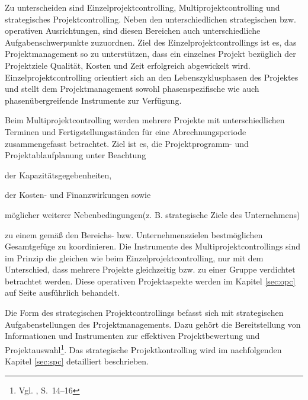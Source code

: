 Zu unterscheiden sind Einzelprojektcontrolling, Multiprojektcontrolling und strategisches Projektcontrolling. Neben den unterschiedlichen strategischen bzw. operativen Ausrichtungen, sind diesen Bereichen auch unterschiedliche Aufgabenschwerpunkte zuzuordnen.
Ziel des Einzelprojektcontrollings ist es, das Projektmanagement so zu unterstützen, dass ein einzelnes Projekt bezüglich der Projektziele Qualität, Kosten und Zeit erfolgreich abgewickelt wird. Einzelprojektcontrolling orientiert sich an den Lebenszyklusphasen des Projektes und stellt dem Projektmanagement sowohl phasenspezifische wie auch phasenübergreifende Instrumente zur Verfügung.

Beim Multiprojektcontrolling werden mehrere Projekte mit unterschiedlichen Terminen und Fertigstellungsständen für eine Abrechnungsperiode zusammengefasst betrachtet. Ziel ist es, die Projektprogramm- und Projektablaufplanung unter Beachtung
\begin{compactitem}
\item der Kapazitätsgegebenheiten,
\item der Kosten- und Finanzwirkungen sowie
\item möglicher weiterer Nebenbedingungen(z. B. strategische Ziele des Unternehmens)
\end{compactitem}
zu einem gemäß den Bereichs- bzw. Unternehmenszielen bestmöglichen Gesamtgefüge zu koordinieren. Die Instrumente des Multiprojektcontrollings sind im Prinzip die gleichen wie beim Einzelprojektcontrolling, nur mit dem Unterschied, dass mehrere Projekte gleichzeitig bzw. zu einer Gruppe verdichtet betrachtet werden. Diese operativen Projektaspekte werden im Kapitel \ref{sec:opc} auf Seite \pageref{sec:opc} ausführlich behandelt.

Die Form des strategischen Projektcontrollings befasst sich mit strategischen Aufgabenstellungen des Projektmanagements. Dazu gehört die Bereitstellung von Informationen und Instrumenten zur effektiven Projektbewertung und Projektauswahl\footnote{Vgl. \cite{Fiedler2008}, S.~14--16}. Das strategische Projektkontrolling wird im nachfolgenden Kapitel \ref{sec:spc} detailliert beschrieben.


